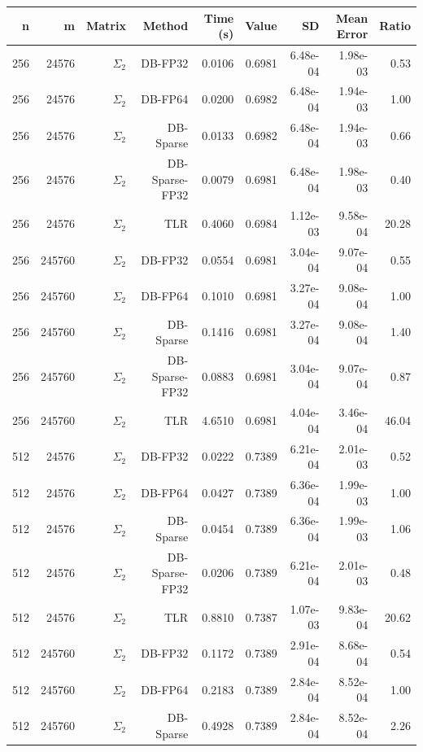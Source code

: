 \begin{tabular}{|r|r|r|r|r|r|r|r|r|}
  \hline
  \textbf{n} & \textbf{m} & \textbf{Matrix} & \textbf{Method} & \textbf{Time (s)} & \textbf{Value} & \textbf{SD} & \textbf{Mean Error} & \textbf{Ratio} \\
  \hline
  256 & 24576 & $\Sigma_2$ & DB-FP32 & 0.0106 & 0.6981 & 6.48e-04 & 1.98e-03 & 0.53 \\
  256 & 24576 & $\Sigma_2$ & DB-FP64 & 0.0200 & 0.6982 & 6.48e-04 & 1.94e-03 & 1.00 \\
  256 & 24576 & $\Sigma_2$ & DB-Sparse & 0.0133 & 0.6982 & 6.48e-04 & 1.94e-03 & 0.66 \\
  256 & 24576 & $\Sigma_2$ & DB-Sparse-FP32 & 0.0079 & 0.6981 & 6.48e-04 & 1.98e-03 & 0.40 \\
  256 & 24576 & $\Sigma_2$ & TLR & 0.4060 & 0.6984 & 1.12e-03 & 9.58e-04 & 20.28 \\
  256 & 245760 & $\Sigma_2$ & DB-FP32 & 0.0554 & 0.6981 & 3.04e-04 & 9.07e-04 & 0.55 \\
  256 & 245760 & $\Sigma_2$ & DB-FP64 & 0.1010 & 0.6981 & 3.27e-04 & 9.08e-04 & 1.00 \\
  256 & 245760 & $\Sigma_2$ & DB-Sparse & 0.1416 & 0.6981 & 3.27e-04 & 9.08e-04 & 1.40 \\
  256 & 245760 & $\Sigma_2$ & DB-Sparse-FP32 & 0.0883 & 0.6981 & 3.04e-04 & 9.07e-04 & 0.87 \\
  256 & 245760 & $\Sigma_2$ & TLR & 4.6510 & 0.6981 & 4.04e-04 & 3.46e-04 & 46.04 \\
  512 & 24576 & $\Sigma_2$ & DB-FP32 & 0.0222 & 0.7389 & 6.21e-04 & 2.01e-03 & 0.52 \\
  512 & 24576 & $\Sigma_2$ & DB-FP64 & 0.0427 & 0.7389 & 6.36e-04 & 1.99e-03 & 1.00 \\
  512 & 24576 & $\Sigma_2$ & DB-Sparse & 0.0454 & 0.7389 & 6.36e-04 & 1.99e-03 & 1.06 \\
  512 & 24576 & $\Sigma_2$ & DB-Sparse-FP32 & 0.0206 & 0.7389 & 6.21e-04 & 2.01e-03 & 0.48 \\
  512 & 24576 & $\Sigma_2$ & TLR & 0.8810 & 0.7387 & 1.07e-03 & 9.83e-04 & 20.62 \\
  512 & 245760 & $\Sigma_2$ & DB-FP32 & 0.1172 & 0.7389 & 2.91e-04 & 8.68e-04 & 0.54 \\
  512 & 245760 & $\Sigma_2$ & DB-FP64 & 0.2183 & 0.7389 & 2.84e-04 & 8.52e-04 & 1.00 \\
  512 & 245760 & $\Sigma_2$ & DB-Sparse & 0.4928 & 0.7389 & 2.84e-04 & 8.52e-04 & 2.26 \\

\end{tabular}
